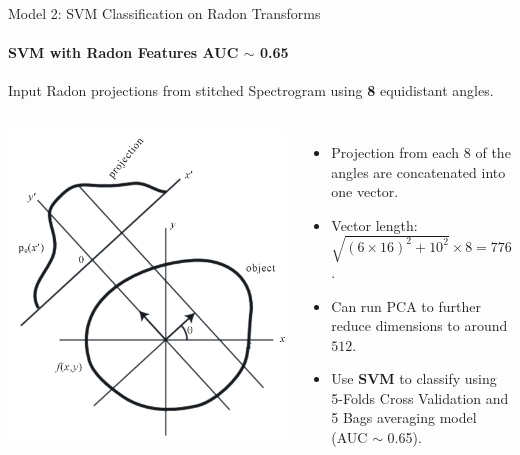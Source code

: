 \documentclass{beamer}
\begin{document}
\begin{frame}{Model 2: SVM Classification on Radon Transforms}
  \framesubtitle{SVM with Radon Features AUC $\sim$ 0.65}

  \begin{block}{Input}
    Radon projections from stitched Spectrogram using \textbf{8} equidistant angles.
  \end{block}

  \begin{columns}

    \begin{center}
  \includegraphics*[scale=0.1]{img/radon_feats.jpg}
    \end{center}

  \begin{itemize}
    \item Projection from each $8$ of the angles are concatenated into one vector.
    \item Vector length: $\sqrt{(6 \times 16)^2 + 10^2} \times 8 = 776$.
    \item Can run PCA to further reduce dimensions to around $512$.
    \item Use \textbf{SVM} to classify using 5-Folds Cross Validation and 5 Bags
      averaging model (AUC $\sim$ 0.65).
  \end{itemize}
  \end{columns}


\end{frame}
\end{document}
